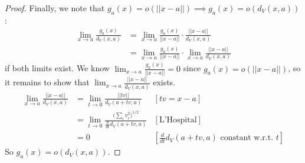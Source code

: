 \documentclass{article}
\newcommand{\ddt}{\frac{d}{dt}}
\begin{document}
\begin{proof}
    Finally, we note that $g_a(x) = o(||x-a||) \implies g_a(x) = o(d_V(x,a))$:
    \begin{align*}
        \lim_{x \to a} \frac{g_a(x)}{d_V(x,a)}
        &= \lim_{x \to a} \frac{g_a(x)}{||x-a||} \cdot \frac{||x-a||}{d_V(x,a)} \\ 
        &= \lim_{x \to a} \frac{g_a(x)}{||x-a||} \cdot \lim_{x \to a} \frac{||x-a||}{d_V(x,a)}
    \end{align*}
    if both limits exist.
    We know $\lim_{x \to a} \frac{g_a(x)}{||x-a||} = 0$ since $g_a(x) = o(||x-a||)$, so it remains to show that $\lim_{x \to a} \frac{||x-a||}{d_V(x,a)}$ exists.
    \begin{align*}
        \lim_{x \to a} \frac{||x-a||}{d_V(x,a)}
        &= \lim_{t \to 0} \frac{||tv||}{d_V(a+tv,a)} &[tv=x-a]\\
        &= \lim_{t \to 0} \frac{\big(\sum_i v_i^2 \big)^{1/2}}{\ddt d_V(a+tv, a)} &[\text{L'Hospital}] \\
        &= 0 &[\ddt d_V(a+tv, a) \text{ constant w.r.t. } t]
    \end{align*}
    So $g_a(x) = o(d_V(x,a))$.
\end{proof}
\end{document}
